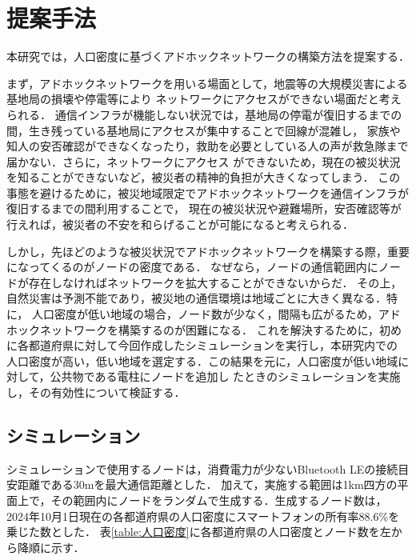 \documentclass[a4paper, 11pt]{ltjsarticle}
\begin{document}
\clearpage
\section{提案手法} \label{提案手法}
本研究では，人口密度に基づくアドホックネットワークの構築方法を提案する．

まず，アドホックネットワークを用いる場面として，地震等の大規模災害による基地局の損壊や停電等により
ネットワークにアクセスができない場面だと考えられる．
通信インフラが機能しない状況では，基地局の停電が復旧するまでの間，生き残っている基地局にアクセスが集中することで回線が混雑し，
家族や知人の安否確認ができなくなったり，救助を必要としている人の声が救急隊まで届かない．さらに，ネットワークにアクセス
ができないため，現在の被災状況を知ることができないなど，被災者の精神的負担が大きくなってしまう．
この事態を避けるために，被災地域限定でアドホックネットワークを通信インフラが復旧するまでの間利用することで，
現在の被災状況や避難場所，安否確認等が行えれば，被災者の不安を和らげることが可能になると考えられる．

しかし，先ほどのような被災状況でアドホックネットワークを構築する際，重要になってくるのがノードの密度である．
なぜなら，ノードの通信範囲内にノードが存在しなければネットワークを拡大することができないからだ．
その上，自然災害は予測不能であり，被災地の通信環境は地域ごとに大きく異なる．特に，
人口密度が低い地域の場合，ノード数が少なく，間隔も広がるため，アドホックネットワークを構築するのが困難になる．
これを解決するために，初めに各都道府県に対して今回作成したシミュレーションを実行し，本研究内での
人口密度が高い，低い地域を選定する．この結果を元に，人口密度が低い地域に対して，公共物である電柱にノードを追加し
たときのシミュレーションを実施し，その有効性について検証する．

\subsection{シミュレーション}
シミュレーションで使用するノードは，消費電力が少ないBluetooth LEの接続目安距離である30mを最大通信距離とした．
加えて，実施する範囲は1km四方の平面上で，その範囲内にノードをランダムで生成する．生成するノード数は，
2024年10月1日現在の各都道府県の人口密度\cite{人口密度}にスマートフォンの所有率88.6\%\cite{スマホ保有率}を乗じた数とした．
表\ref{table:人口密度}に各都道府県の人口密度とノード数を左から降順に示す．
\end{document}
